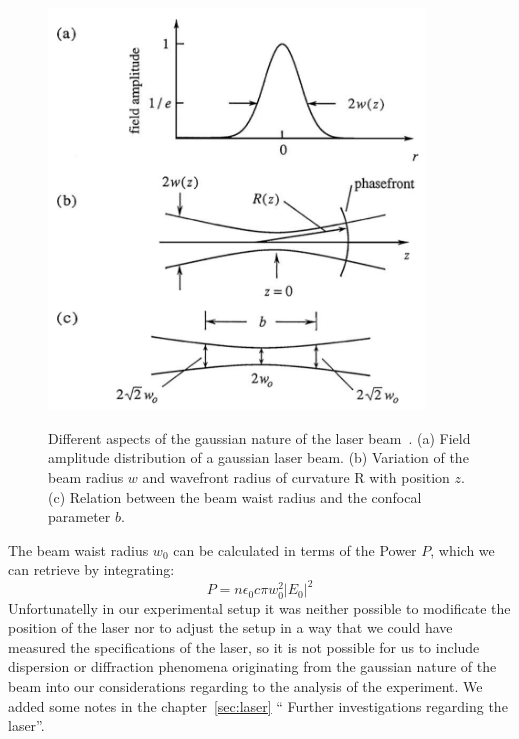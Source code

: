 \begin{figure}
    \begin{centering}
    \caption{Different aspects of the gaussian nature of the laser beam~\cite{boyd2003nonlinear}.
        (a) Field amplitude distribution of a gaussian laser beam. (b) Variation of the beam
        radius $w$ and wavefront radius of curvature R with position $z$.
        (c) Relation between the beam waist radius and the confocal parameter $b$. }
        \includegraphics[width=10cm]{figures/gaussian}
        \label{fig:integral}
    \end{centering}
\end{figure}
The beam waist radius $w_{0}$ can be calculated in terms of the Power $P$, which we can retrieve
by integrating:
\begin{equation}
    P = n \epsilon_0 c \pi w_0^2 |E_0|^2
\end{equation}
Unfortunatelly in our experimental setup it was neither possible to modificate the position of
the laser nor to adjust the setup in a way that we could have measured the specifications of 
the laser, so it is not possible for us to include dispersion or diffraction phenomena originating
from the gaussian nature of the beam into our considerations regarding to the analysis of the 
experiment. We added some notes in the chapter~\ref{sec:laser} ``
Further investigations regarding the laser''.




